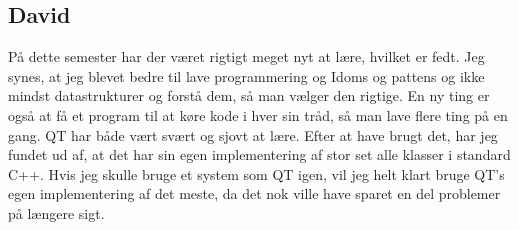 \subsection{David}

På dette semester har der været rigtigt meget nyt at lære, hvilket er fedt. Jeg synes, at jeg blevet bedre til lave programmering og Idoms og pattens og ikke mindst datastrukturer og forstå dem, så man vælger den rigtige. En ny ting er også at få et program til at køre kode i hver sin tråd, så man lave flere ting på en gang. QT har både vært svært og sjovt at lære. Efter at have brugt det, har jeg fundet ud af, at det har sin egen implementering af stor set alle klasser i standard C++. Hvis jeg skulle bruge et system som QT igen, vil jeg helt klart bruge QT's egen implementering af det meste, da det nok ville have sparet en del problemer på længere sigt.